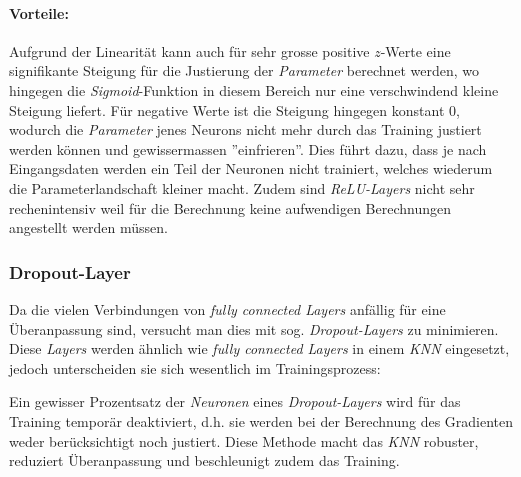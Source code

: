 \paragraph{Vorteile:} Aufgrund der Linearität kann auch für sehr grosse positive $z$-Werte eine signifikante Steigung für die Justierung der \textit{Parameter} berechnet werden, wo hingegen die \textit{Sigmoid}-Funktion in diesem Bereich nur eine verschwindend kleine Steigung liefert. Für negative Werte ist die Steigung hingegen konstant 0, wodurch die \textit{Parameter} jenes Neurons nicht mehr durch das Training justiert werden können und gewissermassen ''einfrieren''. Dies führt dazu, dass je nach Eingangsdaten werden ein Teil der Neuronen nicht trainiert, welches wiederum die Parameterlandschaft kleiner macht. Zudem sind \textit{ReLU-Layers} nicht sehr rechenintensiv weil für die Berechnung keine aufwendigen Berechnungen angestellt werden müssen.

%
%

\subsubsection{Dropout-Layer}
Da die vielen Verbindungen von \textit{fully connected Layers} anfällig für eine Überanpassung sind, versucht man dies mit sog. \textit{Dropout-Layers} zu minimieren. Diese \textit{Layers} werden ähnlich wie \textit{fully connected Layers} in einem \textit{KNN} eingesetzt, jedoch unterscheiden sie sich wesentlich im Trainingsprozess:

Ein gewisser Prozentsatz der \textit{Neuronen} eines \textit{Dropout-Layers} wird für das Training temporär deaktiviert, d.h. sie werden bei der Berechnung des Gradienten weder berücksichtigt noch justiert. Diese Methode macht das \textit{KNN} robuster, reduziert Überanpassung und beschleunigt zudem das Training.

